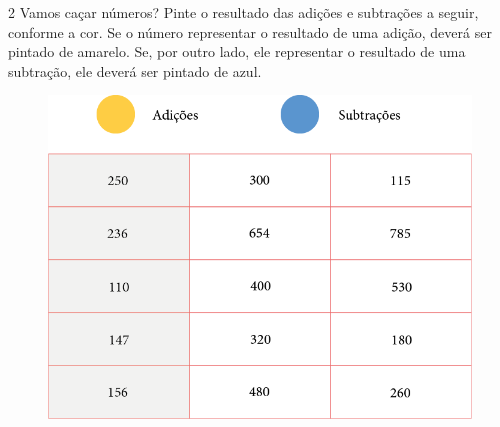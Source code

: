 \pagebreak
\num{2} Vamos caçar números? Pinte o resultado das adições e subtrações a seguir,
conforme a cor. Se o número representar o resultado de uma adição, deverá ser pintado de amarelo. Se, por outro lado, ele representar o resultado de uma subtração, ele deverá ser pintado de azul.

\begin{figure}[htpb!]
\centering
\includegraphics[width=\textwidth]{./media/image20.png}
\end{figure}


